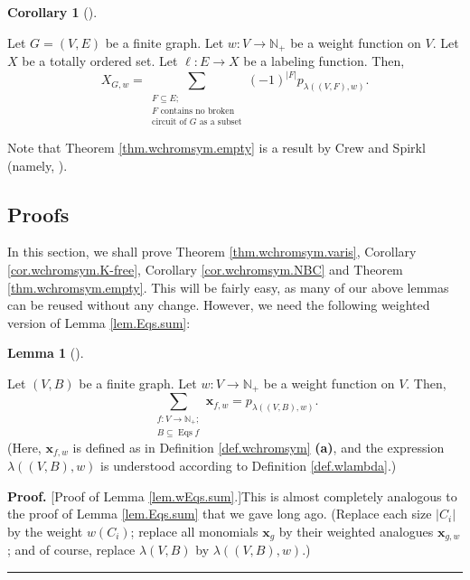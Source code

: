 \documentclass[numbers=enddot,12pt,final,onecolumn,notitlepage]{scrartcl}%
\theoremstyle{definition}
\newtheorem{lem}[theo]{Lemma}
\newenvironment{lemma}[1][]
{\begin{lem}[#1]\begin{leftbar}}
{\end{leftbar}\end{lem}}
\newtheorem{coro}[theo]{Corollary}
\newenvironment{corollary}[1][]
{\begin{coro}[#1]\begin{leftbar}}
{\end{leftbar}\end{coro}}
\newenvironment{proof}[1][Proof]{\noindent\textbf{#1.} }{\ \rule{0.5em}{0.5em}}
\newenvironment{vershort}{}{}
\let\sumnonlimits\sum
\renewcommand{\sum}{\sumnonlimits\limits}
\begin{document}
\begin{corollary}
\label{cor.wchromsym.NBC}Let $G=\left(  V,E\right)  $ be a finite graph. Let
$w:V\rightarrow\mathbb{N}_{+}$ be a weight function on $V$. Let $X$ be a
totally ordered set. Let $\ell:E\rightarrow X$ be a labeling function. Then,%
\[
X_{G,w}=\sum_{\substack{F\subseteq E;\\F\text{ contains no broken}%
\\\text{circuit of }G\text{ as a subset}}}\left(  -1\right)  ^{\left\vert
F\right\vert }p_{\lambda\left(  \left(  V,F\right)  ,w\right)  }.
\]

\end{corollary}

Note that Theorem \ref{thm.wchromsym.empty} is a result by Crew and Spirkl
(namely, \cite[Lemma 3]{CreSpi19}).

\subsection{Proofs}

In this section, we shall prove Theorem \ref{thm.wchromsym.varis}, Corollary
\ref{cor.wchromsym.K-free}, Corollary \ref{cor.wchromsym.NBC} and Theorem
\ref{thm.wchromsym.empty}. This will be fairly easy, as many of our above
lemmas can be reused without any change. However, we need the following
weighted version of Lemma \ref{lem.Eqs.sum}:

\begin{lemma}
\label{lem.wEqs.sum}Let $\left(  V,B\right)  $ be a finite graph. Let
$w:V\rightarrow\mathbb{N}_{+}$ be a weight function on $V$. Then,%
\[
\sum_{\substack{f:V\rightarrow\mathbb{N}_{+};\\B\subseteq\operatorname*{Eqs}%
f}}\mathbf{x}_{f,w}=p_{\lambda\left(  \left(  V,B\right)  ,w\right)  }.
\]
(Here, $\mathbf{x}_{f,w}$ is defined as in Definition \ref{def.wchromsym}
\textbf{(a)}, and the expression $\lambda\left(  \left(  V,B\right)
,w\right)  $ is understood according to Definition \ref{def.wlambda}.)
\end{lemma}

\begin{vershort}
\begin{proof}
[Proof of Lemma \ref{lem.wEqs.sum}.]This is almost completely analogous to the
proof of Lemma \ref{lem.Eqs.sum} that we gave long ago. (Replace each size
$\left\vert C_{i}\right\vert $ by the weight $w\left(  C_{i}\right)  $;
replace all monomials $\mathbf{x}_{g}$ by their weighted analogues
$\mathbf{x}_{g,w}$; and of course, replace $\lambda\left(  V,B\right)  $ by
$\lambda\left(  \left(  V,B\right)  ,w\right)  $.)
\end{proof}
\end{vershort}
\end{document}
